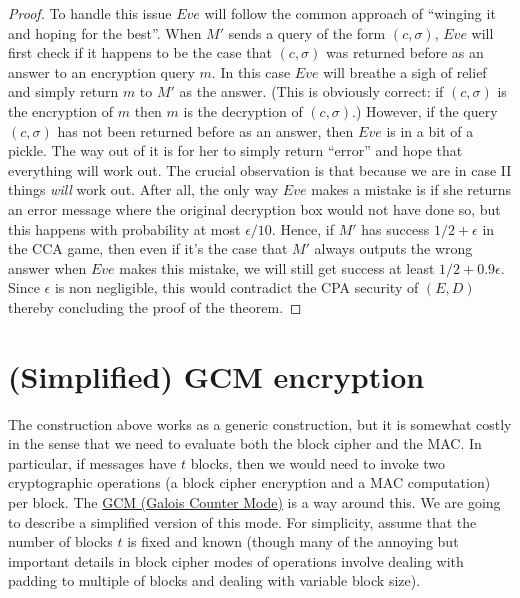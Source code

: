 \begin{proof}
To handle this issue \(Eve\) will follow the common approach of
``winging it and hoping for the best''. When \(M'\) sends a query of the
form \((c,\sigma)\), \(Eve\) will first check if it happens to be the
case that \((c,\sigma)\) was returned before as an answer to an
encryption query \(m\). In this case \(Eve\) will breathe a sigh of
relief and simply return \(m\) to \(M'\) as the answer. (This is
obviously correct: if \((c,\sigma)\) is the encryption of \(m\) then
\(m\) is the decryption of \((c,\sigma)\).) However, if the query
\((c,\sigma)\) has not been returned before as an answer, then \(Eve\)
is in a bit of a pickle. The way out of it is for her to simply return
``error'' and hope that everything will work out. The crucial
observation is that because we are in case II things \emph{will} work
out. After all, the only way \(Eve\) makes a mistake is if she returns
an error message where the original decryption box would not have done
so, but this happens with probability at most \(\epsilon/10\). Hence, if
\(M'\) has success \(1/2+\epsilon\) in the CCA game, then even if it's
the case that \(M'\) always outputs the wrong answer when \(Eve\) makes
this mistake, we will still get success at least \(1/2+0.9\epsilon\).
Since \(\epsilon\) is non negligible, this would contradict the CPA
security of \((E,D)\) thereby concluding the proof of the theorem.

\end{proof}


\section{(Simplified) GCM encryption}\label{Simplified-GCM-encryption}

The construction above works as a generic construction, but it is
somewhat costly in the sense that we need to evaluate both the block
cipher and the MAC. In particular, if messages have \(t\) blocks, then
we would need to invoke two cryptographic operations (a block cipher
encryption and a MAC computation) per block. The
\href{https://goo.gl/uz6WgS}{GCM (Galois Counter Mode)} is a way around
this. We are going to describe a simplified version of this mode. For
simplicity, assume that the number of blocks \(t\) is fixed and known
(though many of the annoying but important details in block cipher modes
of operations involve dealing with padding to multiple of blocks and
dealing with variable block size).

